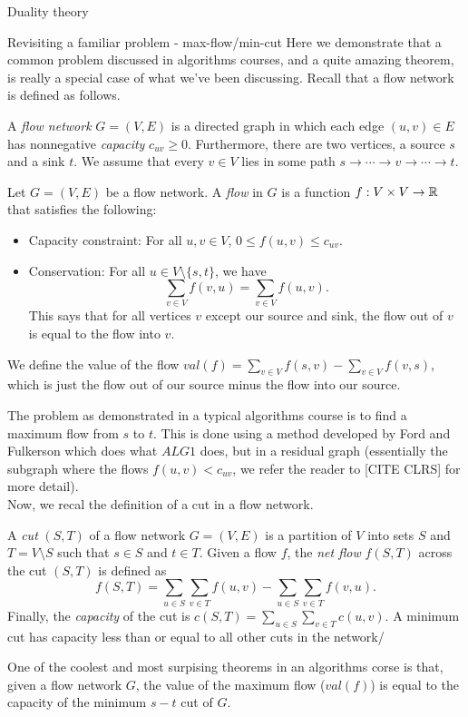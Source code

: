 \begin{section}{Duality theory}
\begin{subsection}{Revisiting a familiar problem - max-flow/min-cut}
	Here we demonstrate that a common problem discussed in algorithms courses, and a quite 
	amazing theorem, is really a special case of what we've been discussing. Recall that a 
	flow network is defined as follows.
	\begin{definition}
		A \emph{flow network} $G = (V,E)$ is a directed graph in which each edge $(u,v)\in E$ 
		has nonnegative \emph{capacity} $c_{uv} \geq 0$. Furthermore, there are two 
		vertices, a source $s$ and a sink $t$. We assume that every $v\in V$ lies in 
		some path $s\to \cdots \to v\to \cdots \to t$.
	\end{definition}
	\begin{definition}
		Let $G = (V,E)$ be a flow network. A \emph{flow} in $G$ is a function $f: V\times V \to 
		\mathbb{R}$ that satisfies the following:
		\begin{itemize}
			\item Capacity constraint: For all $u,v\in V$, $0\leq f(u,v) \leq 
				c_{uv}$.
			\item Conservation: For all $u\in V\setminus \{s,t\}$, we have 
				\[
					\sum _{v\in V} f(v,u) = \sum_{v\in V} f(u,v).
				\]
				This says that for all vertices $v$ except our source and sink, the 
				flow out of $v$ is equal to the flow into $v$. 
		\end{itemize}
		We define the value of the flow $val(f) = \sum_{v\in V} f(s,v) - \sum_{v\in V} f(v,s)$, 
		which is just the flow out of our source minus the flow into our source.
	\end{definition}
	The problem as demonstrated in a typical algorithms course is to find a maximum flow from $s$ 
	to $t$. This is done using a method developed by Ford and Fulkerson which does what $ALG 1$ 
	does, but in a residual graph (essentially the subgraph where the flows $f(u,v) < c_{uv}$, we 
	refer the reader to [CITE CLRS] for more detail). \\
	Now, we recal the definition of a cut in a flow network.
	\begin{definition}
		A \emph{cut} $(S,T)$ of a flow network $G=(V,E)$ is a partition of $V$ into sets $S$ 
		and $T = V\setminus S$ such that $s\in S$ and $t\in T$. Given a flow $f$, the 
		\emph{net flow} $f(S,T)$ across the cut $(S,T)$ is defined as 
		\[
			f(S,T) = \sum_{u\in S} \sum_{v\in T} f(u,v) - \sum_{u\in S} \sum_{v\in T} 
			f(v,u).
		\]
		Finally, the \emph{capacity} of the cut is $c(S,T) = 
		\sum_{u\in S} \sum_{v\in T} c(u,v)$. A minimum cut has capacity less than or equal to 
		all other cuts in the network/
	\end{definition}
	One of the coolest and most surpising theorems in an algorithms corse is that, given a flow 
	network $G$, the value of the maximum flow ($val(f)$) is equal to the capacity of the minimum 
	$s-t$ cut of $G$.


\end{subsection}
\end{section}
